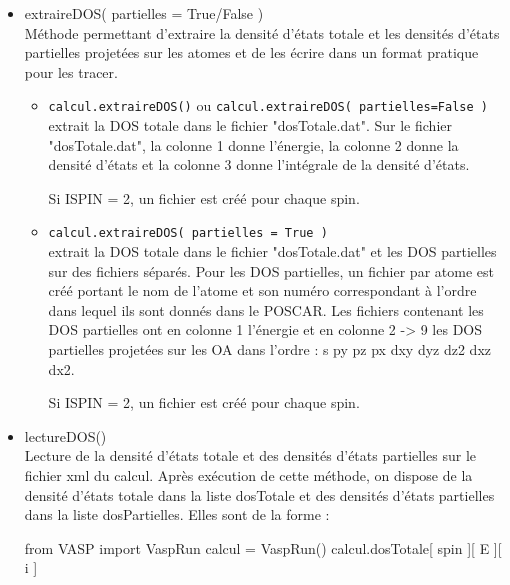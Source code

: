 \documentclass[10pt,a4paper,fleqn]{article}
\begin{document}
\begin{itemize}
	\item extraireDOS( partielles = True/False ) \\

		Méthode permettant d'extraire la densité d'états totale et les densités d'états
		partielles projetées sur les atomes et de les écrire dans un format pratique pour
		les tracer.  \\

		\begin{itemize}
			\item \verb!calcul.extraireDOS()! ou 
				\verb!calcul.extraireDOS( partielles=False )! \\
				
				extrait la DOS totale dans le fichier "dosTotale.dat". Sur le
				fichier "dosTotale.dat", la colonne 1 donne l'énergie, la colonne 2
				donne la densité d'états et la colonne 3 donne l'intégrale de la
				densité d'états. \par
				Si ISPIN = 2, un fichier est créé pour chaque spin. \\

			\item \verb!calcul.extraireDOS( partielles = True ) ! \\

				extrait la DOS totale dans le fichier "dosTotale.dat" et les DOS
				partielles sur des fichiers séparés. Pour les DOS partielles, un
				fichier par atome est créé portant le nom de l'atome et son numéro
				correspondant à l'ordre dans lequel ils sont donnés dans le POSCAR.
				Les fichiers contenant les DOS partielles ont en colonne 1 l'énergie
				et en colonne 2 -> 9 les DOS partielles projetées sur les OA dans
				l'ordre : s py pz px dxy dyz dz2 dxz dx2. \par
				Si ISPIN = 2, un fichier est créé pour chaque spin. \\
		\end{itemize}



	\item lectureDOS() \\

		Lecture de la densité d'états totale et des densités d'états partielles sur le
		fichier xml du calcul. Après exécution de cette méthode, on dispose de la densité
		d'états totale dans la liste dosTotale et des densités d'états partielles dans la
		liste dosPartielles. Elles sont de la forme :


\begin{console}
from VASP import VaspRun
calcul = VaspRun()
calcul.dosTotale[ spin ][ E ][ i ]
\end{console}
    

\end{itemize}
\end{document}
